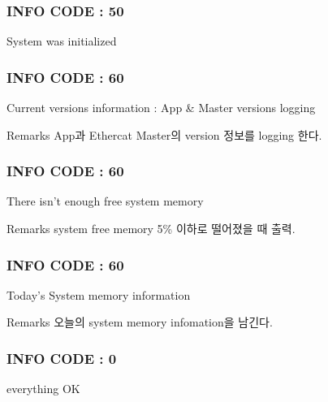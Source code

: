  \subsubsection*{I\-N\-F\-O C\-O\-D\-E \-: 50 }

System was initialized



 \subsubsection*{I\-N\-F\-O C\-O\-D\-E \-: 60 }

Current versions information \-: App \& Master versions logging \begin{DoxyRemark}{Remarks}
App과 Ethercat Master의 version 정보를 logging 한다.
\end{DoxyRemark}


 \subsubsection*{I\-N\-F\-O C\-O\-D\-E \-: 60 }

There isn't enough free system memory \begin{DoxyRemark}{Remarks}
system free memory 5\% 이하로 떨어졌을 때 출력.
\end{DoxyRemark}


 \subsubsection*{I\-N\-F\-O C\-O\-D\-E \-: 60 }

Today's System memory information \begin{DoxyRemark}{Remarks}
오늘의 system memory infomation을 남긴다.
\end{DoxyRemark}


 \subsubsection*{I\-N\-F\-O C\-O\-D\-E \-: 0 }

everything O\-K 